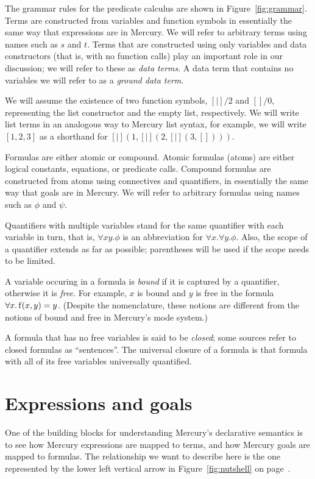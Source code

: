 The grammar rules for the predicate calculus
are shown in Figure~\ref{fig:grammar}.
Terms are constructed from variables and function symbols
in essentially the same way that expressions are in Mercury.
We will refer to arbitrary terms using names such as $s$ and $t$.
Terms that are constructed using only variables and data constructors
(that is, with no function calls)
play an important role in our discussion;
we will refer to these as \emph{data terms}.
A data term that contains no variables
we will refer to as a \emph{ground data term}.

We will assume the existence of two function symbols,
$[|]/2$ and $[]/0$,
representing the list constructor and the empty list,
respectively.
We will write list terms in an analogous way to Mercury list syntax,
for example,
we will write
$[1, 2, 3]$ as a shorthand for $[|](1, [|](2, [|](3, [])))$.

Formulas are either atomic or compound.
Atomic formulas (atoms\label{gi:atom2}) are either
logical constants, equations, or predicate calls.
Compound formulas are constructed from atoms
using connectives and quantifiers,
in essentially the same way that goals are in Mercury.
We will refer to arbitrary formulas
using names such as $\phi$ and $\psi$.

Quantifiers with multiple variables stand for
the same quantifier with each variable in turn,
that is, $\forall x y.\phi$
is an abbreviation for $\forall x.\forall y.\phi$.
Also, the scope of a quantifier extends as far as possible;
parentheses will be used if the scope needs to be limited.

A variable occuring in a formula is \emph{bound\label{gi:bound}}
if it is captured by a quantifier,
otherwise it is \emph{free\label{gi:free}}.
For example,
$x$ is bound and $y$ is free
in the formula $\forall x. \operatorname{f}(x, y) = y$.
(Despite the nomenclature,
these notions are different from the notions of bound and free
in Mercury's mode system.)

A formula that has no free variables
is said to be \emph{closed\label{gi:closed-formula}};
some sources refer to closed formulas as ``sentences''.
The universal closure of a formula is that formula with
all of its free variables universally quantified.


\section{Expressions and goals}
\label{sec:goals}

One of the building blocks
for understanding Mercury's declarative semantics
is to see how Mercury expressions are mapped to terms,
and how Mercury goals are mapped to formulas.
The relationship we want to describe here is
the one represented by the lower left vertical arrow
in Figure~\ref{fig:nutshell} on page~\pageref{fig:nutshell}.

